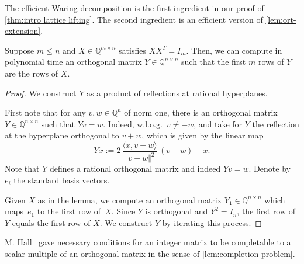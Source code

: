 \documentclass[a4paper,USenglish,cleveref,numberwithinsect]{lipics-v2021}
\newcommand{\QQ}{\mathbb{Q}}
\numberwithin{equation}{section}
\begin{document}
The efficient Waring decomposition is the first ingredient in our proof of \cref{thm:intro lattice lifting}.
The second ingredient is an efficient version of \cref{lem:ort-extension}.

\begin{lemma}\label{lem:completion-problem}
Suppose $m\leq n$ and $X\in\QQ^{m\times n}$ satisfies $X X^T = I_m$.
Then, we can compute in polynomial time an orthogonal matrix $Y\in\QQ^{n\times n}$ such that the first $m$ rows of $Y$ are the rows of $X$.
\end{lemma}

\begin{proof}
We construct $Y$ as a product of reflections at rational hyperplanes.

First note that for any $v,w\in\QQ^n$ of norm one,
there is an orthogonal matrix $Y\in\QQ^{n\times n}$
such that $Yv = w$. Indeed, w.l.o.g.\ $v\ne-w$,
and take for $Y$ the reflection at the hyperplane orthogonal to $v+w$,
which is given by the linear map
\begin{equation*}%
 Y x  := 2 \, \frac{\langle x, v+w\rangle}{\Vert v+w\Vert^2} \, (v+w)  - x .
\end{equation*}
Note that $Y$ defines a rational orthogonal matrix and indeed $Yv=w$.
Denote by $e_i$ the standard basis vectors.

Given $X$ as in the lemma,
we compute an orthogonal matrix $Y_1\in\QQ^{n\times n}$
which maps~$e_1$ to the first row of~$X$.
Since $Y$ is orthogonal and $Y^2=I_n$, the first row of $Y$ equals the first row of $X$.
We construct $Y$ by iterating this process.
\end{proof}

\begin{remark}
M. Hall~\cite{hall-completion-2,hall-completion}
gave necessary conditions for an integer matrix to be completable
to a scalar multiple of an orthogonal matrix
in the sense of \cref{lem:completion-problem}.
\end{remark}
\end{document}
